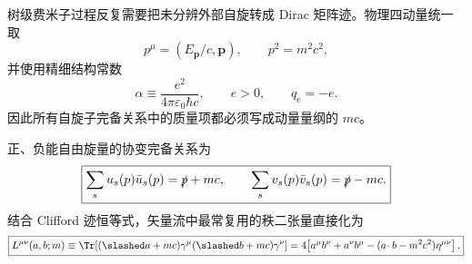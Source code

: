 
树级费米子过程反复需要把未分辨外部自旋转成 Dirac 矩阵迹。物理四动量统一取
\begin{equation*}
 p^\mu=(E_{\mathbf p}/c,\mathbf p),
 \qquad p^2=m^2c^2,
\end{equation*}
并使用精细结构常数
\begin{equation*}
 \alpha\equiv\frac{e^2}{4\pi\varepsilon_0\hbar c},
 \qquad e>0,
 \qquad q_{\mathrm e}=-e.
\end{equation*}
因此所有自旋子完备关系中的质量项都必须写成动量量纲的 \(mc\)。

正、负能自由旋量的协变完备关系为
\begin{equation}
 \boxed{
 \sum_su_s(p)\bar u_s(p)=\slashed p+mc,
 \qquad
 \sum_sv_s(p)\bar v_s(p)=\slashed p-mc.}
 \label{eq:spin-sum-si-r9}
\end{equation}
结合 Clifford 迹恒等式，矢量流中最常复用的秩二张量直接化为
\begin{equation}
 \boxed{
 L^{\mu\nu}(a,b;m)
 \equiv
 \Tr[(\slashed a+mc)\gamma^\mu(\slashed b+mc)\gamma^\nu]
 =4\!
 \left[a^\mu b^\nu+a^\nu b^\mu
 -(a\!\cdot b-m^2c^2)\eta^{\mu\nu}\right].}
 \label{eq:qed-basic-tensor-si-r9}
\end{equation}

